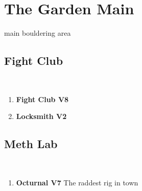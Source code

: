\chapter{The Garden Main}
\lhead{\textcolor{\chapterColor}{\rule[-2pt]{\textwidth}{15pt}}}
main bouldering area

\section{Fight Club}
\

\begin{enumerate}
\item \textbf{Fight Club V8       } \newline \lipsum[6]
\item \textbf{Locksmith V2     } \newline \lipsum[3]
\end{enumerate}

\section{Meth Lab}
\

\begin{enumerate}[resume]
\item \textbf{Octurnal V7         } \newline The raddest rig in town
\end{enumerate}

\clearpage